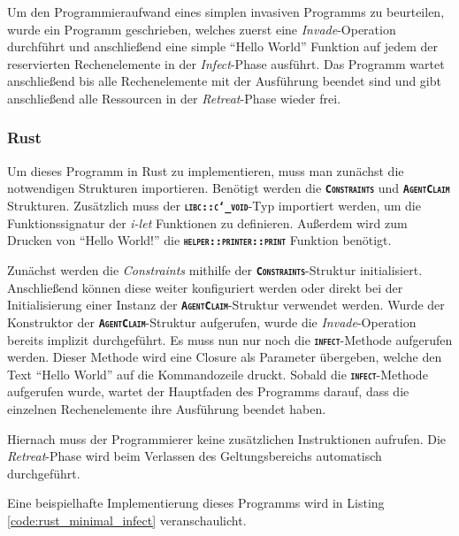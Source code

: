 Um den Programmieraufwand eines simplen invasiven Programms zu beurteilen, wurde ein Programm geschrieben, 
welches zuerst eine \textit{Invade}-Operation durchführt und anschließend eine simple "`Hello World"'
Funktion auf jedem der reservierten Rechenelemente in der \textit{Infect}-Phase ausführt.
Das Programm wartet anschließend bis alle Rechenelemente mit der Ausführung beendet sind und gibt anschließend
alle Ressourcen in der \textit{Retreat}-Phase wieder frei.

\subsubsection{Rust}

Um dieses Programm in Rust zu implementieren, muss man zunächst die notwendigen Strukturen importieren.
Benötigt werden die \texttt{\textsc{\textbf{Constraints}}} und \texttt{\textsc{\textbf{AgentClaim}}} Strukturen. 
Zusätzlich muss der \texttt{\textsc{\textbf{libc::c\char`_void}}}-Typ importiert werden,
um die Funktionssignatur der \textit{i-let} Funktionen zu definieren.
Außerdem wird zum Drucken von "`Hello World!"' die \texttt{\textsc{\textbf{helper::printer::print}}}
Funktion benötigt.

Zunächst werden die \textit{Constraints} mithilfe der \texttt{\textsc{\textbf{Constraints}}}-Struktur initialisiert.
Anschließend können diese weiter konfiguriert werden oder direkt bei der Initialisierung einer Instanz der
\texttt{\textsc{\textbf{AgentClaim}}}-Struktur verwendet werden. Wurde der Konstruktor
der \texttt{\textsc{\textbf{AgentClaim}}}-Struktur aufgerufen,
wurde die \textit{Invade}-Operation bereits implizit durchgeführt.
Es muss nun nur noch die \texttt{\textsc{\textbf{infect}}}-Methode aufgerufen werden.
Dieser Methode wird eine Closure als Parameter übergeben, welche den
Text "`Hello World"' auf die Kommandozeile druckt. Sobald die \texttt{\textsc{\textbf{infect}}}-Methode
aufgerufen wurde, wartet der Hauptfaden des Programms darauf,
dass die einzelnen Rechenelemente ihre Ausführung beendet haben.

Hiernach muss der Programmierer keine zusätzlichen Instruktionen aufrufen. Die \textit{Retreat}-Phase wird beim
Verlassen des Geltungsbereichs automatisch durchgeführt.

Eine beispielhafte Implementierung dieses Programms wird in Listing \ref{code:rust_minimal_infect} veranschaulicht.

